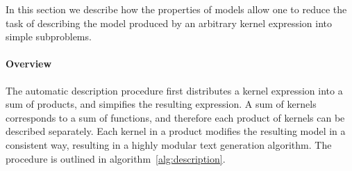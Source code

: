 \documentclass[letterpaper]{article}
\begin{document}
In this section we describe how the properties of \gp{} models allow one to reduce the task of describing the model produced by an arbitrary kernel expression into simple subproblems.


\paragraph{Overview}

The automatic description procedure first distributes a kernel expression into a sum of products, and simpifies the resulting expression.
A sum of kernels corresponds to a sum of functions, and therefore each product of kernels can be described separately.
Each kernel in a product modifies the resulting model in a consistent way, resulting in a highly modular text generation algorithm.
The procedure is outlined in algorithm~\ref{alg:description}.



\end{document}
